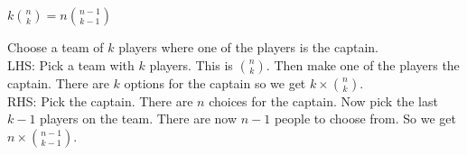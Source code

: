 \question $k\binom{n}{k} = n\binom{n - 1}{k - 1}$ \\

\begin{solution}[3 cm]
Choose a team of $k$ players where one of the players is the captain. \\
LHS: Pick a team with $k$ players. This is ${n \choose k}$. Then make one of the players the captain. There are $k$ options for the captain so we get $k \times \binom{n}{k}$. \\
RHS: Pick the captain. There are $n$ choices for the captain. Now pick the last $k - 1$ players on the team. There are now $n - 1$ people to choose from. So we get $n \times \binom{n - 1}{k - 1}$.
\end{solution}